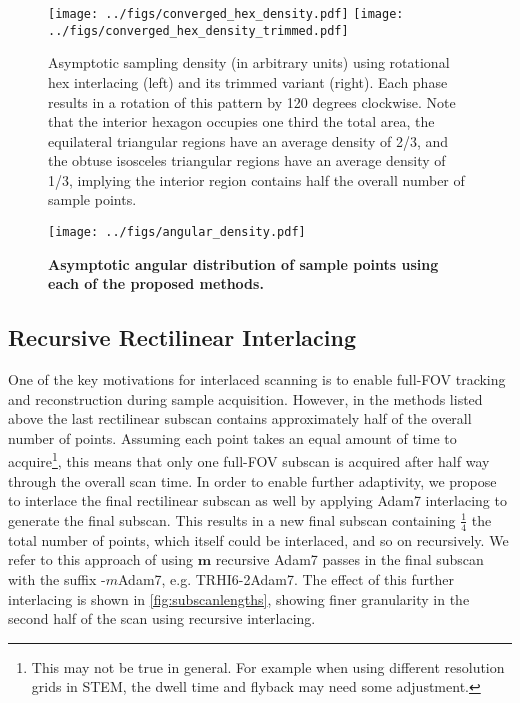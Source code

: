 \documentclass[aip, amsmath, amssymb, nobibnotes, nofootinbib, citeautoscript, reprint, superscriptaddress]{revtex4-1}
\begin{document}
    \begin{figure*}
        \centering
        \texttt{[image: ../figs/converged\_hex\_density.pdf]}
        \texttt{[image: ../figs/converged\_hex\_density\_trimmed.pdf]}
        \caption{
        \label{fig:hexdensity}
            Asymptotic sampling density (in arbitrary units) using rotational hex interlacing (left) and its trimmed variant (right).
        Each phase results in a rotation of this pattern by 120 degrees clockwise.
        Note that the interior hexagon occupies one third the total area, the equilateral triangular regions have an average density of 2/3, and the obtuse isosceles triangular regions have an average density of 1/3, implying the interior region contains half the overall number of sample points.
        }
    \end{figure*}


    \begin{figure*}
        \centering
        \texttt{[image: ../figs/angular\_density.pdf]}
        \caption{
        \label{fig:angdens} 
            \textbf{Asymptotic angular distribution of sample points using each of the proposed methods.}
        }
    \end{figure*}

    \subsection{Recursive Rectilinear Interlacing}
    \label{sec:recursive}

    One of the key motivations for interlaced scanning is to enable full-FOV tracking and reconstruction during sample acquisition.
    However, in the methods listed above the last rectilinear subscan contains approximately half of the overall number of points.
    Assuming each point takes an equal amount of time to acquire\footnote{This may not be true in general. For example when using different resolution grids in STEM, the dwell time and flyback may need some adjustment.}, this means that only one full-FOV subscan is acquired after half way through the overall scan time.
    In order to enable further adaptivity, we propose to interlace the final rectilinear subscan as well by applying Adam7 interlacing to generate the final subscan.
    This results in a new final subscan containing $\mathrm{\frac{1}{4}}$ the total number of points, which itself could be interlaced, and so on recursively.
    We refer to this approach of using $\mathbf{m}$ recursive Adam7 passes in the final subscan with the suffix -$\mathit{m}$Adam7, e.g. TRHI6-2Adam7.
    The effect of this further interlacing is shown in \autoref{fig:subscanlengths}, showing finer granularity in the second half of the scan using recursive interlacing.
\end{document}
